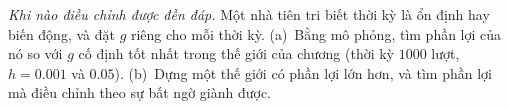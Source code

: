 \begin{exercise}[\lvlC]
\label{ex:08:7}
\emph{Khi nào điều chỉnh được đền đáp.} Một nhà tiên tri biết thời kỳ là ổn định hay biến động, và đặt $g$ riêng cho mỗi thời kỳ. (a)~Bằng mô phỏng, tìm phần lợi của nó so với $g$ cố định tốt nhất trong thế giới của chương (thời kỳ $1000$ lượt, $h=0.001$ và $0.05$). (b)~Dựng một thế giới có phần lợi lớn hơn, và tìm phần lợi mà điều chỉnh theo sự bất ngờ giành được.
\end{exercise}
